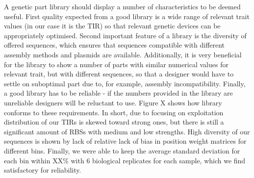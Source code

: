 \documentclass{article}
\begin{document}
A genetic part library should display a number of characteristics to be deemed useful.
First quality expected from a good library is a wide range of relevant trait values (in our case it is the TIR) so that relevant genetic devices can be appropriately optimised.
Second important feature of a library is the diversity of offered sequences, which ensures that sequences compatible with different assembly methods and plasmids are available. 
Additionally, it is very beneficial for the library to show a number of parts with similar numerical values for relevant trait, but with different sequences, so that a designer would have to settle on suboptimal part due to, for example, assembly incompatibility.
Finally, a good library has to be reliable - if the numbers provided in the library are unreliable designers will be reluctant to use.
Figure X shows how library conforms to these requirements.
In short, due to focusing on exploitation distribution of our TIRs is skewed toward strong ones, but there is still a significant amount of RBSs with medium and low strengths.
High diversity of our sequences is shown by lack of relative lack of bias in position weight matrices for different bins.
Finally, we were able to keep the average standard deviation for each bin within XX\% with 6 biological replicates for each sample, which we find satisfactory for reliability.\\
\end{document}
